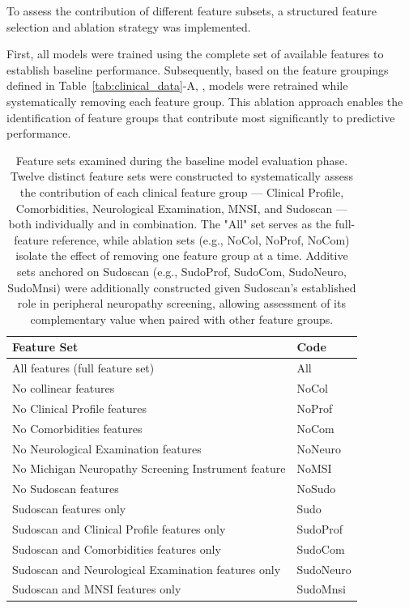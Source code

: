 \documentclass[pdflatex,sn-vancouver-num]{sn-jnl}
\begin{document}
To assess the contribution of different feature subsets, a structured feature selection and ablation strategy was implemented.

First, all models were trained using the complete set of available features to establish baseline performance. Subsequently, based on the feature groupings defined in Table~\ref{tab:clinical_data}-A, , models were retrained while systematically removing each feature group. This ablation approach enables the identification of feature groups that contribute most significantly to predictive performance.

\begin{table}[h!]
\centering
\small
\begin{tabular}{ll}
\toprule
Feature Set & Code  \\
\midrule
All features (full feature set) &  All   \\
No collinear features  &  NoCol\\
No Clinical Profile features  &  NoProf\\
No Comorbidities features & NoCom \\
No Neurological Examination features & NoNeuro \\
No Michigan Neuropathy Screening Instrument feature & NoMSI  \\
No Sudoscan features & NoSudo \\
Sudoscan features only & Sudo \\
Sudoscan and Clinical Profile features only & SudoProf \\
Sudoscan and Comorbidities features only & SudoCom \\
Sudoscan and Neurological Examination features only & SudoNeuro \\
Sudoscan and MNSI features only & SudoMnsi \\
\bottomrule
\end{tabular}
\caption{Feature sets examined during the baseline model evaluation phase. Twelve distinct feature sets were constructed to systematically assess the contribution of each clinical feature group — Clinical Profile, Comorbidities, Neurological Examination, MNSI, and Sudoscan — both individually and in combination. The "All" set serves as the full-feature reference, while ablation sets (e.g., NoCol, NoProf, NoCom) isolate the effect of removing one feature group at a time. Additive sets anchored on Sudoscan (e.g., SudoProf, SudoCom, SudoNeuro, SudoMnsi) were additionally constructed given Sudoscan's established role in peripheral neuropathy screening, allowing assessment of its complementary value when paired with other feature groups.}
\label{tab:feature_sets}
\end{table}
\end{document}
